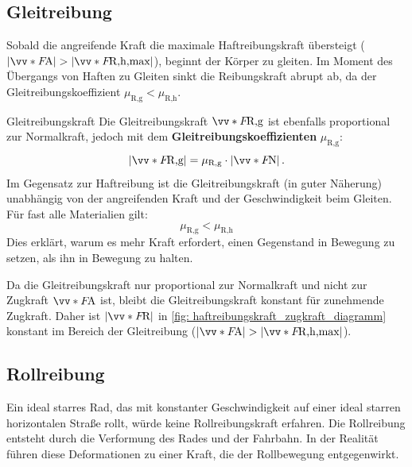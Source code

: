 \subsection{Gleitreibung}\label{subsec: Gleitreibung}
Sobald die angreifende Kraft die maximale Haftreibungskraft übersteigt ($|\ivecS{F}{\text{A}}| > |\ivecS{F}{\text{R,h,max}}|$), beginnt der Körper zu gleiten. Im Moment des Übergangs von Haften zu Gleiten sinkt die Reibungskraft abrupt ab, da der Gleitreibungskoeffizient $\mu_{\text{R,g}} < \mu_{\text{R,h}}$. 

\begin{importantbox}[]{Gleitreibungskraft}
Die Gleitreibungskraft $\ivecS{F}{\text{R,g}}$ ist ebenfalls proportional zur Normalkraft, jedoch mit dem \textbf{Gleitreibungskoeffizienten} $\mu_{\text{R,g}}$:
\begin{equation}\label{eq: gleitreibungskraft}
    |\ivecS{F}{\text{R,g}}| = \mu_{\text{R,g}} \cdot |\ivecS{F}{\text{N}}|\mDot
\end{equation}
Im Gegensatz zur Haftreibung ist die Gleitreibungskraft (in guter Näherung) unabhängig von der angreifenden Kraft und der Geschwindigkeit beim Gleiten. Für fast alle Materialien gilt:
\begin{equation}
    \mu_{\text{R,g}} < \mu_{\text{R,h}}
\end{equation}
Dies erklärt, warum es mehr Kraft erfordert, einen Gegenstand in Bewegung zu setzen, als ihn in Bewegung zu halten.
\end{importantbox}
Da die Gleitreibungskraft nur proportional zur Normalkraft und nicht zur Zugkraft $\ivecS{F}{\text{A}}$ ist, bleibt die Gleitreibungskraft konstant für zunehmende Zugkraft. Daher ist $|\ivecS{F}{\text{R}}|$ in \cref{fig: haftreibungskraft_zugkraft_diagramm} konstant im Bereich der Gleitreibung ($|\ivecS{F}{\text{A}}| > |\ivecS{F}{\text{R,h,max}}|$).

\subsection{Rollreibung}
Ein ideal starres Rad, das mit konstanter Geschwindigkeit auf einer ideal starren horizontalen Straße rollt, würde keine Rollreibungskraft erfahren. Die Rollreibung entsteht durch die Verformung des Rades und der Fahrbahn. In der Realität führen diese Deformationen zu einer Kraft, die der Rollbewegung entgegenwirkt.

